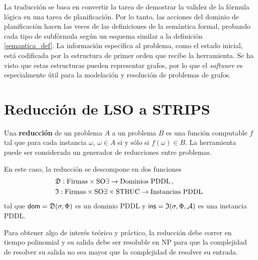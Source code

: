 La traducción se basa en convertir la tarea de demostrar la validez de la
fórmula lógica en una tarea de planificación. Por lo tanto, las acciones del
dominio de planificación hacen las veces de las definiciones de la semántica
formal, probando cada tipo de subfórmula según un esquema similar a la
definición \ref{semantica_def}. La información específica al problema, como el
estado inicial, está codificada por la estructura de primer orden que recibe la
herramienta. Se ha visto que estas estructuras pueden representar grafos, por lo
que el \textit{software} es especialmente útil para la modelación y resolución
de problemas de grafos.

\section{Reducción de LSO a STRIPS}
\label{reduccion}
Una \textbf{reducción} de un problema $A$ a un problema $B$ es una función
computable $f$ tal que para cada instancia
$\omega$, $\omega\in A$ si y sólo si $f(\omega)\in B$.
La herramienta puede ser considerada un generador de reducciones entre problemas.

En este caso, la reducción se descompone en dos funciones
\begin{alignat*}{1}
&\mathfrak{D}: \text{Firmas} \times \text{SO}\exists \rightarrow \text{Dominios PDDL}\,, \\
&\mathfrak{I}: \text{Firmas} \times \text{SO}\exists \times \text{STRUC} \rightarrow \text{Instancias PDDL}
\end{alignat*}
tal que $\mathsf{dom}=\mathfrak{D}(\sigma,\Phi)$ es un dominio PDDL
y $\mathsf{ins}=\mathfrak{I}(\sigma,\Phi,\mathcal{A})$ es una instancia PDDL.

Para obtener algo de interés teórico y práctico, la reducción debe correr en
tiempo polinomial y su salida debe ser resoluble en NP para que la complejidad
de resolver su salida no sea mayor que la complejidad de resolver su entrada.

%

